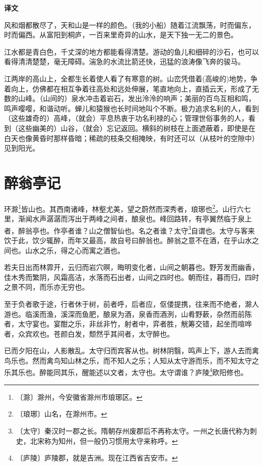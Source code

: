 \documentclass[12pt,UTF-8,openany,a4]{ctexbook}
\begin{document}
\newpage

\begin{Large}
    \noindent\textbf{译文}
\end{Large}


\vspace{1em}

\begin{large}
    \yiwen 
    风和烟都散尽了，天和山是一样的颜色。（我的小船）随着江流飘荡，时而偏东，时而偏西。从富阳到桐庐，一百来里奇异的山水，是天下独一无二的景色。
    
    江水都是青白色，千丈深的地方都能看得清楚。游动的鱼儿和细碎的沙石，也可以看得清清楚楚，毫无障碍。湍急的水流比箭还快，迅猛的浪涛像飞奔的骏马。
    
    江两岸的高山上，全都生长着使人看了有寒意的树。山峦凭借着(高峻的)地势，争着向上，仿佛都在相互争着往高处和远处伸展，笔直地向上，直插云天，形成了无数的山峰。（山间的）泉水冲击着岩石，发出泠泠的响声；美丽的百鸟互相和鸣，鸣声嘤嘤，和谐动听。蝉儿和猿猴也长时间地叫个不断。极力追求名利的人，看到（这些雄奇的）高峰，（就会）平息热衷于功名利禄的心；管理世俗事务的人，看到（这些幽美的）山谷，（就会）忘记返回。横斜的树枝在上面遮蔽着，即使是在白天也像黄昏时那样昏暗；稀疏的枝条交相掩映，有时还可以（从枝叶的空隙中）见到阳光。
    
\end{large}



\chapter{醉翁亭记}

\begin{large}
    
    环滁\footnote{〔滁〕\yiwen 滁州，今安徽省滁州市琅琊区。}皆山也。其西南诸峰，林壑尤美，望之蔚然而深秀者，琅琊也\footnote{〔琅琊〕\yiwen 山名，在滁州市。}。山行六七里，渐闻水声潺潺而泻出于两峰之间者，酿泉也。峰回路转，有亭翼然临于泉上者，醉翁亭也。作亭者谁？山之僧智仙也。名之者谁？太守\footnote{〔太守〕\yiwen 秦汉时一郡之长。隋朝存州废郡后不再称太守。一州之长唐代称为刺史，北宋称为知州，但一般仍习惯用太守来称呼。}自谓也。太守与客来饮于此，饮少辄醉，而年又最高，故自号曰醉翁也。醉翁之意不在酒，在乎山水之间也。山水之乐，得之心而寓之酒也。
    
    若夫日出而林霏开，云归而岩穴暝，晦明变化者，山间之朝暮也。野芳发而幽香，佳木秀而繁阴，风霜高洁，水落而石出者，山间之四时也。朝而往，暮而归，四时之景不同，而乐亦无穷也。
    
    至于负者歌于途，行者休于树，前者呼，后者应，伛偻提携，往来而不绝者，滁人游也。临溪而渔，溪深而鱼肥，酿泉为酒，泉香而酒洌，山肴野蔌，杂然而前陈者，太守宴也。宴酣之乐，非丝非竹，射者中，弈者胜，觥筹交错，起坐而喧哗者，众宾欢也。苍颜白发，颓然乎其间者，太守醉也。
    
    已而夕阳在山，人影散乱。太守归而宾客从也。树林阴翳，鸣声上下，游人去而禽鸟乐也。然而禽鸟知山林之乐，而不知人之乐；人知从太守游而乐，而不知太守之乐其乐也。醉能同其乐，醒能述以文者，太守也。太守谓谁？庐陵\footnote{〔庐陵〕\yiwen 庐陵郡，就是吉洲。现在江西省吉安市。}欧阳修也。
\end{large}
\end{document}
